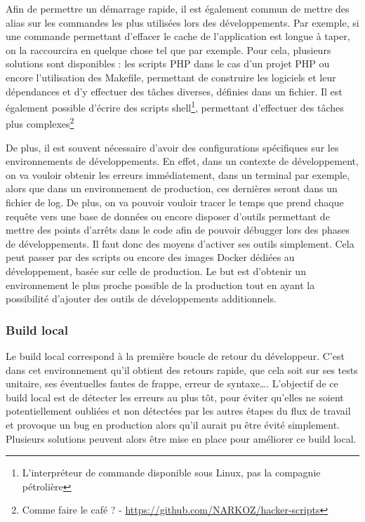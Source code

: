 Afin de permettre un démarrage rapide, il est également commun de mettre des alias sur les commandes les plus utilisées lors des développements. Par exemple, si une commande permettant d'effacer le cache de l'application est longue à taper, on la raccourcira en quelque chose tel que  par exemple. Pour cela, plusieurs solutions sont disponibles : les scripts \gls{PHP} dans le cas d'un projet \gls{PHP} ou encore l'utilisation des Makefile, permettant de construire les logiciels et leur dépendances et d'y effectuer des tâches diverses, définies dans un fichier. Il est également possible d'écrire des scripts shell\footnote{L'interpréteur de commande disponible sous Linux, pas la compagnie pétrolière }, permettant d'effectuer des tâches plus complexes\footnote{Comme faire le café ?  - \url{https://github.com/NARKOZ/hacker-scripts}}

De plus, il est souvent nécessaire d'avoir des configurations spécifiques sur les environnements de développements. En effet, dans un contexte de développement, on va vouloir obtenir les erreurs immédiatement, dans un terminal par exemple, alors que dans un environnement de production, ces dernières seront dans un fichier de log. De plus, on va pouvoir vouloir tracer le temps que prend chaque requête vers une base de données ou encore disposer d'outils permettant de mettre des points d'arrêts dans le code afin de pouvoir débugger lors des phases de développements. Il faut donc des moyens d'activer ses outils simplement. Cela peut passer par des scripts ou encore des images Docker dédiées au développement, basée sur celle de production. Le but est d'obtenir un environnement le plus proche possible de la production tout en ayant la possibilité d'ajouter des outils de développements additionnels.

\subsubsection{Build local}

Le build local correspond à la première boucle de retour du développeur. C'est dans cet environnement qu'il obtient des retours rapide, que cela soit sur ses tests unitaire, ses éventuelles fautes de frappe, erreur de syntaxe\ldots. L'objectif de ce build local est de détecter les erreurs au plus tôt, pour éviter qu'elles ne soient potentiellement oubliées et non détectées par les autres étapes du flux de travail et provoque un bug en production alors qu'il aurait pu être évité simplement. Plusieurs solutions peuvent alors être mise en place pour améliorer ce build local.

